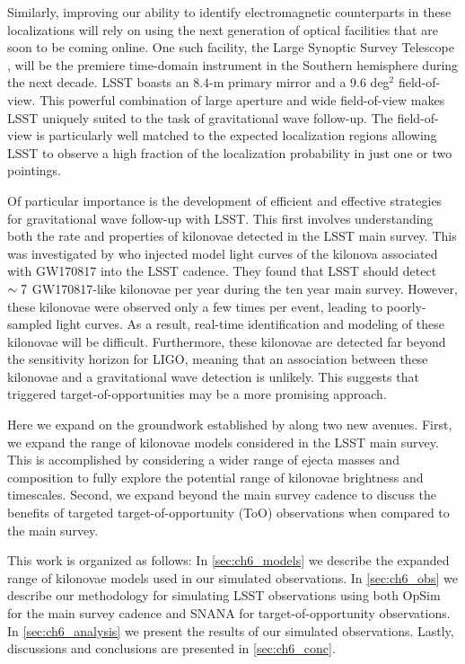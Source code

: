 Similarly, improving our ability to identify electromagnetic counterparts in these localizations will rely on using the next generation of optical facilities that are soon to be coming online. One such facility, the Large Synoptic Survey Telescope \citep[LSST,][]{Ivezic+09}, will be the premiere time-domain instrument in the Southern hemisphere during the next decade. LSST boasts an 8.4-m primary mirror and a 9.6 deg$^2$ field-of-view. This powerful combination of large aperture and wide field-of-view makes LSST uniquely suited to the task of gravitational wave follow-up. The field-of-view is particularly well matched to the expected localization regions allowing LSST to observe a high fraction of the localization probability in just one or two pointings.

Of particular importance is the development of efficient and effective strategies for gravitational wave follow-up with LSST. This first involves understanding both the rate and properties of kilonovae detected in the LSST main survey. This was investigated by \citet{Scolnic+18} who injected model light curves of the kilonova associated with GW170817 \citep[hereafer just ``GW170817" for simplicity][]{Cowp+17} into the LSST cadence. They found that LSST should detect $\sim7$ GW170817-like kilonovae per year during the ten year main survey. However, these kilonovae were observed only a few times per event, leading to poorly-sampled light curves. As a result, real-time identification and modeling of these kilonovae will be difficult. Furthermore, these kilonovae are detected far beyond the sensitivity horizon for LIGO, meaning that an association between these kilonovae and a gravitational wave detection is unlikely. This suggests that triggered target-of-opportunities may be a more promising approach.

Here we expand on the groundwork established by \citet{Scolnic+18} along two new avenues. First, we expand the range of kilonovae models considered in the LSST main survey. This is accomplished by considering a wider range of ejecta masses and composition to fully explore the potential range of kilonovae brightness and timescales. Second, we expand beyond the main survey cadence to discuss the benefits of targeted target-of-opportunity (ToO) observations when compared to the main survey.

This work is organized as follows: In \cref{sec:ch6_models} we describe the expanded range of kilonovae models used in our simulated observations. In \cref{sec:ch6_obs} we describe our methodology for simulating LSST observations using both OpSim for the main survey cadence and SNANA for target-of-opportunity observations. In \cref{sec:ch6_analysis} we present the results of our simulated observations. Lastly, discussions and conclusions are presented in \cref{sec:ch6_conc}.

